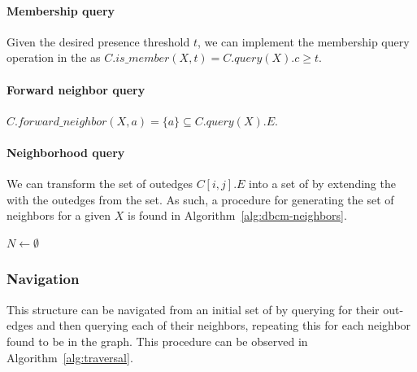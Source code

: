 \paragraph{Membership query} Given the desired presence threshold $t$, we can implement the membership query operation in the \dBCM as $C.\mathit{is\_member}(X, t) = C.\mathit{query}(X).c \geq t$.
\paragraph{Forward neighbor query} $C.\mathit{forward\_neighbor}(X, a) = \{a\} \subseteq C.\mathit{query}(X).E$.
\paragraph{Neighborhood query} We can transform the set of outedges $C[i,j].E$ into a set of  by extending the \kmer with the outedges from the set. As such, a procedure for generating the set of neighbors for a given \kmer $X$ is found in Algorithm~\ref{alg:dbcm-neighbors}.

\begin{algorithm}
	\caption{$C.\mathit{neighbors}(X)$}\label{alg:dbcm-neighbors}
  $N \gets \emptyset$\\
\end{algorithm}

\subsubsection{Navigation}
\label{subsubsec:dbcm-navigation}

This structure can be navigated from an initial set of  by querying for their out-edges and then querying each of their neighbors, repeating this for each neighbor found to be in the graph. This procedure can be observed in Algorithm~\ref{alg:traversal}.

